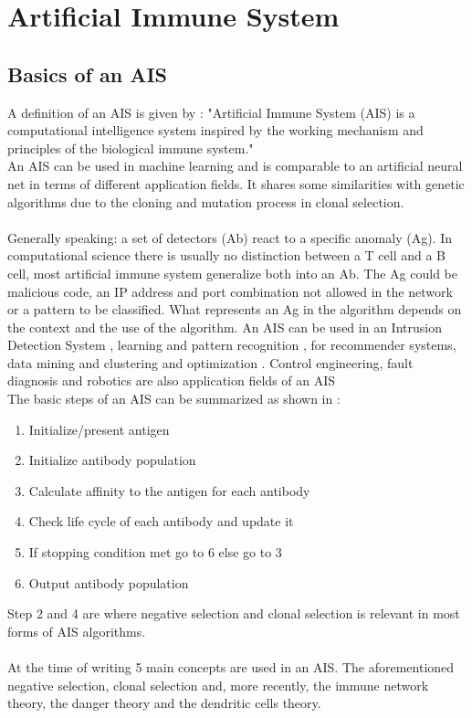 \chapter{Artificial Immune System}
\label{chap:ais}
\section{Basics of an AIS}
A definition of an AIS is given by \cite[p. 5]{tan2016artificial}:
"Artificial Immune System (AIS) is a computational intelligence system inspired by the working mechanism and principles of the biological immune system."\\An AIS can be used in machine learning and is comparable to an artificial neural net in terms of different application fields.
It shares some similarities with genetic algorithms due to the cloning and mutation process in clonal selection.\\\\
Generally speaking: a set of detectors (Ab) react to a specific anomaly (Ag). In computational science there is usually no distinction between a T cell and a B cell, most artificial immune system generalize both into an Ab. The Ag could be malicious code, an IP address and port combination not allowed in the network or a pattern to be classified. What represents an Ag in the algorithm depends on the context and the use of the algorithm. An AIS can be used in an Intrusion Detection System \cite{PAM17}, learning and pattern recognition \cite{DEC02}, for recommender systems, data mining and clustering \cite{burke2013} and optimization \cite{NAN08}. Control engineering, fault diagnosis and robotics are also application fields of an AIS \cite{tan2016artificial}\\

The basic steps of an AIS can be summarized as shown in \cite{tan2016artificial}:
\begin{enumerate}
	\item 	Initialize/present antigen
	\item 	Initialize antibody population
	\item 	Calculate affinity to the antigen for each antibody
	\item 	Check life cycle of each antibody and update it
	\item 	If stopping condition met go to 6 else go to 3
	\item 	Output antibody population
\end{enumerate}
Step 2 and 4 are where negative selection and clonal selection is relevant in most forms of AIS algorithms.\\\\
At the time of writing 5 main concepts are used in an AIS. The aforementioned negative selection, clonal selection and, more recently, the immune network theory, the danger theory and the dendritic cells theory. 

